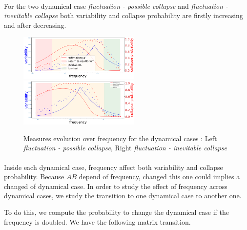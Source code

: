 \documentclass{article}
\begin{document}
\paragraph{}
For the two dynamical case \textit{fluctuation - possible collapse} and \textit{fluctuation - inevitable collapse} both variability and collapse probability are firstly increasing and after decreasing. 



\begin{figure}[h!]
\begin{center}
\includegraphics[width=6cm]{results/equivalent_moderate_2.png} \includegraphics[width=6cm]{results/equivalent_always.png}
\end{center}
\caption{\label{fig:temp}Measures evolution over frequency for the dynamical cases : Left \textit{fluctuation - possible collapse}, Right \textit{fluctuation - inevitable collapse}}
\end{figure}





\newpage
\label{transition}
\paragraph{}
Inside each dynamical case, frequency affect both variability and collapse probability. Because $AB$ depend of frequency, changed this one could implies a changed of dynamical case. In order to study the effect of frequency across dynamical cases, we study the transition to one dynamical case to another one.

To do this, we compute the probability to change the dynamical case if the frequency is doubled. We have the following matrix transition.


\end{document}
